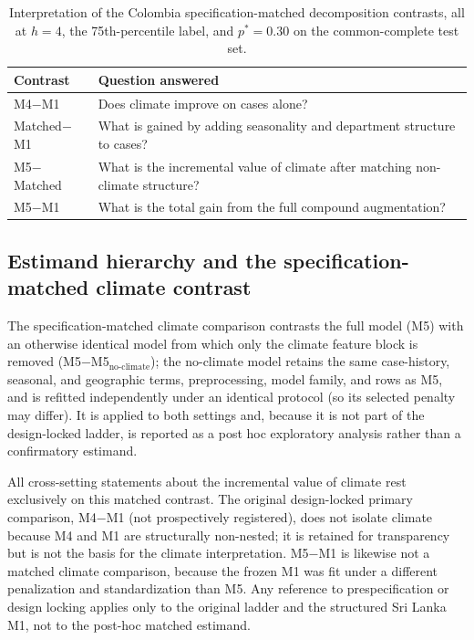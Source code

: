 \documentclass[11pt,a4paper]{article}
\begin{document}
\begin{table}[H]
\centering
\caption{Interpretation of the Colombia specification-matched decomposition contrasts, all at $h=4$, the 75th-percentile label, and $p^*=0.30$ on the common-complete test set.}
\label{tab:contrastq}
\begin{tabular}{ll}
\toprule
Contrast & Question answered \\
\midrule
M4$-$M1 & Does climate improve on cases alone? \\
Matched$-$M1 & What is gained by adding seasonality and department structure to cases? \\
M5$-$Matched & What is the incremental value of climate after matching non-climate structure? \\
M5$-$M1 & What is the total gain from the full compound augmentation? \\
\bottomrule
\end{tabular}
\end{table}


\subsection{Estimand hierarchy and the specification-matched climate contrast}
The specification-matched climate comparison contrasts the full model (M5) with an otherwise identical model from which only the climate feature block is removed (M5$-$M5$_{\text{no-climate}}$); the no-climate model retains the same case-history, seasonal, and geographic terms, preprocessing, model family, and rows as M5, and is refitted independently under an identical protocol (so its selected penalty may differ). It is applied to both settings and, because it is not part of the design-locked ladder, is reported as a post hoc exploratory analysis rather than a confirmatory estimand.

All cross-setting statements about the incremental value of climate rest exclusively on this matched contrast. The original design-locked primary comparison, M4$-$M1 (not prospectively registered), does not isolate climate because M4 and M1 are structurally non-nested; it is retained for transparency but is not the basis for the climate interpretation. M5$-$M1 is likewise not a matched climate comparison, because the frozen M1 was fit under a different penalization and standardization than M5. Any reference to prespecification or design locking applies only to the original ladder and the structured Sri Lanka M1, not to the post-hoc matched estimand.
\end{document}
